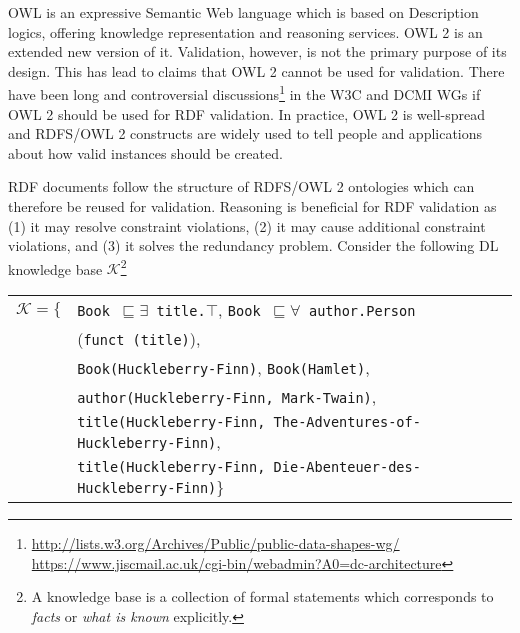 \documentclass{llncs}
\newcommand{\ms}[1]{\texttt{#1}}
\newcommand{\tb}[1]{\todo[size=\small, color=green!40]{\textbf{Thomas:} #1}}
\newenvironment{DL}{
  \vspace{0cm}
  \begin{tabular}{r l}

}{
  \end{tabular}
}
\begin{document}
OWL is an expressive Semantic Web language which is based on Description logics, offering knowledge representation and reasoning services. OWL 2 is an extended new version of it. Validation, however, is not the primary purpose of its design. 
This has lead to claims that OWL 2 cannot be used for validation. 
There have been long and controversial discussions\footnote{\url{http://lists.w3.org/Archives/Public/public-data-shapes-wg/}\\ \url{https://www.jiscmail.ac.uk/cgi-bin/webadmin?A0=dc-architecture}} in the W3C and DCMI WGs if OWL 2 should be used for RDF validation.
In practice, OWL 2 is well-spread and RDFS/OWL 2 constructs are widely used to tell people and applications about how valid instances should be created.

RDF documents follow the structure of RDFS/OWL 2 ontologies which can therefore be reused for validation. 
Reasoning is beneficial for RDF validation as 
(1) it may resolve constraint violations, 
(2) it may cause additional constraint violations, and 
(3) it solves the redundancy problem. 
Consider the following DL knowledge base $\mathcal{K}$\footnote{A knowledge base is a collection of formal statements  which corresponds to \emph{facts} or  \emph{what is known} explicitly.}

\begin{center}
\begin{DL} 
$\mathcal{K}=\{$ & \ms{Book $\sqsubseteq \exists$ title.$\top$}, \ms{Book $\sqsubseteq \forall$ author.Person }\\
 &(\ms{funct (title)}),\\
 &\ms{Book(Huckleberry-Finn)}, \ms{Book(Hamlet)},\\
 &\ms{author(Huckleberry-Finn, Mark-Twain)},\\
 &\ms{title(Huckleberry-Finn, The-Adventures-of-Huckleberry-Finn)},\\
 &\ms{title(Huckleberry-Finn, Die-Abenteuer-des-Huckleberry-Finn)}\}\\ 
\end{DL}
\end{center}
\end{document}
